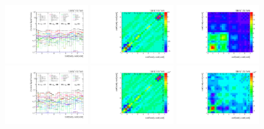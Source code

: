 \begin{figure}[htb]
\begin{center}
 \includegraphics[width=0.32\textwidth]{fig_fullRun2UL/unfolding/combined/deltaSystCombinedlog_rebinnedB_c_Pnr_mttbar.pdf}
 \includegraphics[width=0.32\textwidth]{fig_fullRun2UL/unfolding/combined/StatCovMatrix_rebinnedB_c_Pnr_mttbar.pdf}
 \includegraphics[width=0.32\textwidth]{fig_fullRun2UL/unfolding/combined/TotalSystCovMatrix_rebinnedB_c_Pnr_mttbar.pdf} \\
 \includegraphics[width=0.32\textwidth]{fig_fullRun2UL/unfolding/combined/deltaSystCombinedlogNorm_rebinnedB_c_Pnr_mttbar.pdf}
 \includegraphics[width=0.32\textwidth]{fig_fullRun2UL/unfolding/combined/StatCovMatrixNorm_rebinnedB_c_Pnr_mttbar.pdf}
 \includegraphics[width=0.32\textwidth]{fig_fullRun2UL/unfolding/combined/TotalSystCovMatrixNorm_rebinnedB_c_Pnr_mttbar.pdf} \\

\end{center}
\end{figure}
